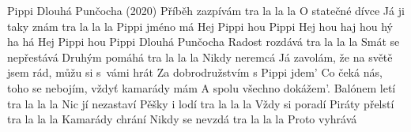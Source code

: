\begin{TEXT}{Pippi Dlouhá Punčocha (2020)}
\SLOKA Příběh zazpívám tra la la la O statečné dívce \NL
Já ji taky znám tra la la la Pippi jméno má \NL
\REFREN Hej Pippi hou Pippi \NL
Hej hou haj hou hý ha há \NL
Hej Pippi hou Pippi \NL
Dlouhá Punčocha \NL
\SLOKA Radost rozdává tra la la la Smát se nepřestává \NL
Druhým pomáhá  tra la la la Nikdy neremcá \NL
\REFRENB  Já zavolám, že na světě jsem rád, můžu si s vámi hrát \NL
Za dobrodružstvím s Pippi jdem' \NL
Co čeká nás, toho se nebojím, vždyť kamarády mám \NL
A spolu všechno dokážem'. \NL
\SLOKA Balónem letí tra la la la Nic jí nezastaví \NL
Pěšky i lodí tra la la la Vždy si poradí \NL
\SLOKA Piráty přelstí  tra la la la Kamarády chrání \NL
Nikdy se nevzdá  tra la la la Proto vyhrává \NL
\REFRENHRAJ
\end{TEXT}